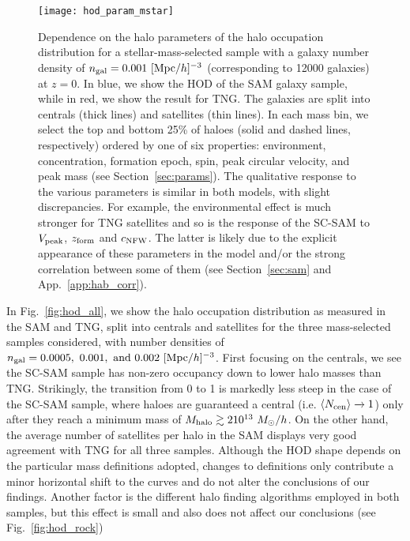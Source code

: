 \documentclass[fleqn,usenatbib]{mnras}
\newcommand{\rss}[1]{\textcolor{purple}{(rss: #1)}}
\begin{document}
\begin{figure*}
\centering  
\texttt{[image: hod\_param\_mstar]}
\caption{
Dependence on the halo parameters of the halo occupation distribution for a stellar-mass-selected sample with a galaxy number density of $n_{\rm gal} = 0.001 \ [{\rm Mpc}/h]^{-3}$ (corresponding to 12000 galaxies) at $z = 0$. In blue, we show the HOD of the SAM galaxy sample, while in red, we show the result for TNG. The galaxies are split into centrals (thick lines) and satellites (thin lines). In each mass bin, we select the top and bottom 25\% of haloes (solid and dashed lines, respectively) ordered by one of six properties: environment, concentration, formation epoch, spin, peak circular velocity, and peak mass (see Section~\ref{sec:params}). The qualitative response to the various parameters is similar in both models, with slight discrepancies. For example, the environmental effect is much stronger for TNG satellites and so is the response of the SC-SAM to
$V_{\rm peak}$, $z_{\rm form}$ and $c_{\rm NFW}$. The latter is likely due to the explicit appearance of these parameters in the model and/or the strong correlation between some of them (see Section~\ref{sec:sam} and App.~\ref{app:hab_corr}).}
\label{fig:hod_param_mstar}
\end{figure*}

In Fig.~\ref{fig:hod_all}, we show the halo occupation distribution as measured in the SAM and TNG, split into centrals and satellites for the three mass-selected samples considered, with number densities of $n_{\rm gal} = 0.0005, \ 0.001, \ {\rm and} \ 0.002 \ [{\rm Mpc}/h]^{-3}$. First focusing on the centrals, we see the SC-SAM sample has non-zero occupancy down to lower halo masses than TNG. Strikingly, the transition from 0 to 1 is markedly less steep in the case of the SC-SAM sample, where haloes are guaranteed a central (i.e. $\langle N_{\rm cen} \rangle \xrightarrow[]{}1$) only after they reach a minimum mass of $M_{\rm halo} \gtrsim 2 10^{13} \ M_\odot/h$. On the other hand, the average number of satellites per halo in the SAM displays very good agreement with TNG for all three samples. Although the HOD shape depends on the particular mass definitions adopted, changes to definitions only contribute a minor horizontal shift to the curves and do not alter the conclusions of our findings. Another factor is the different halo finding algorithms employed in both samples, but this effect is small and also does not affect our conclusions (see Fig.~\ref{fig:hod_rock})
\end{document}
